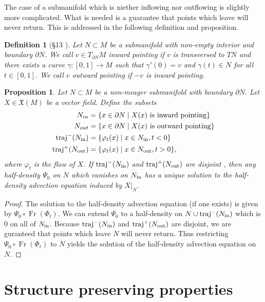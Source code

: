 \documentclass[12pt]{amsart}
\renewcommand{\phi}{\varphi}
\newtheorem{prop}{Proposition}
\newtheorem{defn}{Definition}
\DeclareMathOperator{\Fr}{Fr}
\begin{document}
The case of a submanifold which is niether inflowing nor outflowing is slightly more complicated.
What is needed is a guarantee that points which leave will never return.
This is addressed in the following definition and proposition.

\begin{defn}[\S 13 \cite{Lee2006}]
  Let $N \subset M$ be a submanifold with non-empty interior and boundary $\partial N$.
  We call $v \in T_{\partial N}M$ \emph{inward pointing} if $v$ is transversed to $TN$ and there exists a curve $\gamma: [0,1] \to M$ such that $\gamma'(0) = v$ and $\gamma(t) \in N$ for all $t \in [0,1]$.
We call $v$ \emph{outward pointing} if $-v$ is inward pointing.
\end{defn}

\begin{prop}
  Let $N \subset M$ be a non-meager submanifold with boundary $\partial N$.
  Let $X \in \mathfrak{X}(M)$ be a vector field.
  Define the subsets
  \begin{align*}
    N_{in} &= \{ x \in \partial N \mid X(x) \text{ is inward pointing} \} \\
    N_{out}&= \{ x \in \partial N \mid X(x) \text{ is outward pointing} \} \\
    {\rm traj}^-(N_{\rm in}) &= \{ \phi_{t}(x) \mid x \in N_{\rm in}, t < 0 \} \\
    {\rm traj}^+(N_{\rm out}) &= \{ \phi_{t}(x) \mid x \in N_{\rm out}, t > 0 \},
  \end{align*}
  where $\phi_t$ is the flow of $X$.
  If ${\rm traj}^-(N_{\rm in})$ and ${\rm traj}^+(N_{\rm out})$ are disjoint , then any half-density $\Psi_0$ on $N$ which vanishes on $N_{\rm in}$ has a unique solution to the half-density advection equation induced by $X|_{N}$.
\end{prop}
\begin{proof}
  The solution to the half-density advection equation (if one exists) is given by $\Psi_0 \circ \Fr( \Phi_t)$.  We can extend $\Psi_0$ to a half-density on $N \cup {\rm traj}^-(N_{\rm in})$ which is $0$ on all of $N_{\rm in}$.
  Because ${\rm traj}^-(N_{\rm in})$ and ${\rm traj}^+(N_{\rm out})$ are disjoint, we are guranteed that points which leave $N$ will never return.
  Thus restricting $\Psi_0 \circ \Fr( \Phi_t)$ to $N$ yields the solution of the half-density advection equation on $N$.
\end{proof}



\section{Structure preserving properties}
\label{sec:structure}
\end{document}
